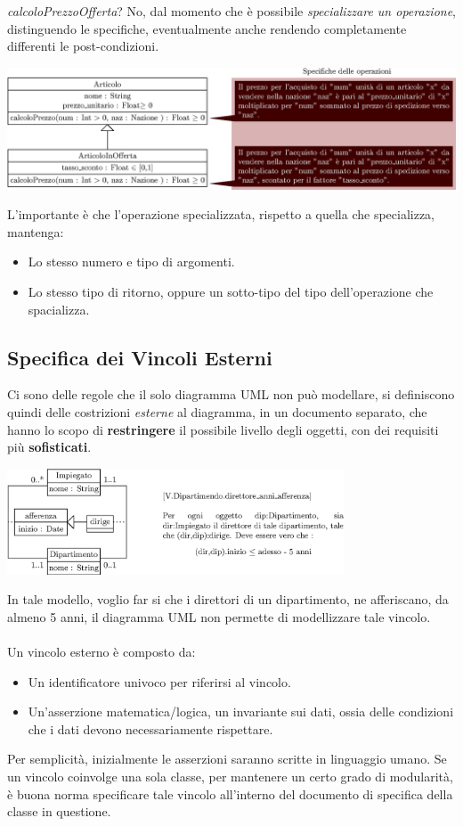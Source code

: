 \documentclass[12pt, letterpaper]{article}
\newcommand{\acc}{\\\hphantom{}\\}
\begin{document}
\textit{calcoloPrezzoOfferta}? No, dal momento che è possibile \textit{specializzare un operazione}, distinguendo
le specifiche, eventualmente anche rendendo completamente differenti le post-condizioni. \begin{center}
    \includegraphics[width=\textwidth ]{images/specOperazione.eps}
\end{center}
L'importante è che l'operazione specializzata, rispetto a quella che specializza, mantenga:\begin{itemize}
    \item Lo stesso numero e tipo di argomenti.
    \item Lo stesso tipo di ritorno, oppure un sotto-tipo del tipo dell'operazione che spacializza.
\end{itemize}
\subsection{Specifica dei Vincoli Esterni}
Ci sono delle regole che il solo diagramma UML non può modellare, si definiscono
quindi delle costrizioni \textit{esterne} al diagramma, in un documento separato,
che hanno lo scopo di \textbf{restringere} il possibile livello degli oggetti,
con dei requisiti più \textbf{sofisticati}.\begin{center}
    \includegraphics[width=0.75\textwidth ]{images/vincoliEsterni.eps}
\end{center}
In tale modello, voglio far si che i direttori di un dipartimento, ne afferiscano,
da almeno 5 anni, il diagramma UML non permette di modellizzare tale vincolo.\acc
Un vincolo esterno è composto da:\begin{itemize}
    \item Un identificatore univoco per riferirsi al vincolo.
    \item Un'asserzione matematica/logica, un invariante sui dati, ossia delle
          condizioni che i dati devono necessariamente rispettare.
\end{itemize}
Per semplicità, inizialmente le asserzioni saranno scritte in linguaggio
umano. Se un vincolo coinvolge una sola classe, per mantenere un certo grado di
modularità, è buona norma specificare tale vincolo all'interno del documento
di specifica della classe in questione.
\end{document}
